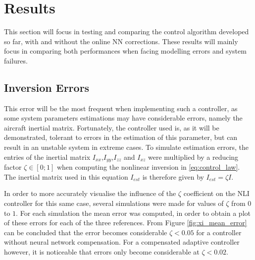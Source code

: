 
\section{Results}
\label{sec:resul}

This section will focus in testing and comparing the control algorithm developed so far, with and without the online NN corrections. These results will mainly focus in comparing both performances when facing modelling errors and system failures.


\subsection{Inversion Errors}

This error will be the most frequent when implementing such a controller, as some system parameters estimations may have considerable errors, namely the aircraft inertial matrix. Fortunately, the controller used is, as it will be demonstrated, tolerant to errors in the estimation of this parameter, but can result in an unstable system in extreme cases. To simulate estimation errors, the entries of the inertial matrix $I_{xx}$,$I_{yy}$,$I_{zz}$ and $I_{xz}$ were multiplied by a reducing factor $\zeta \in [0;1]$ when computing the nonlinear inversion in \ref{eq:control_law}. The inertial matrix used in this equation $I_{est}$ is therefore given by $I_{est} = \zeta I$.

In order to more accurately visualise the influence of the $\zeta$ coefficient on the NLI controller for this same case, several simulations were made for values of $\zeta$ from $0$ to $1$. For each simulation the mean error was computed, in order to obtain a plot of these errors for each of the three references. From Figure \ref{fig:xi_mean_error} can be concluded that the error becomes considerable $\zeta<0.05$ for a controller without neural network compensation. For a compensated adaptive controller however, it is noticeable that errors only become considerable at $\zeta<0.02$.

